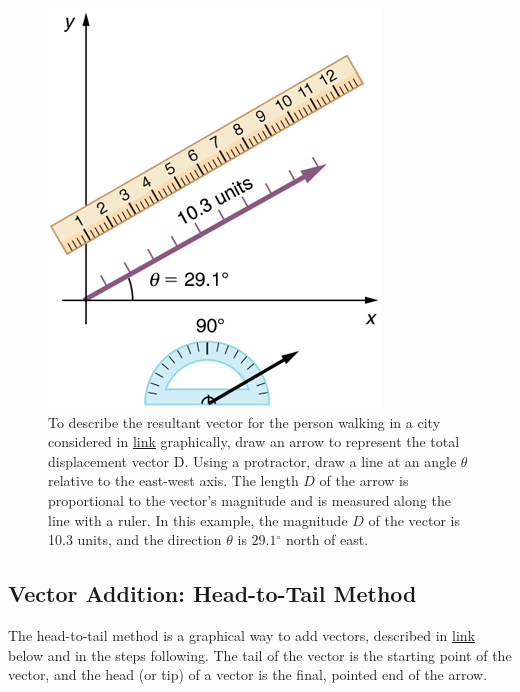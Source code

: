 \documentclass[
]{book}
\begin{document}
\begin{figure}
\hypertarget{import-auto-id1165298918248}{%
\centering
\includegraphics{images/Figure_03_02_02a.jpg}
\caption{To describe the resultant vector for the person walking in a city
considered in
\protect\hyperlink{import-auto-id1165298666909}{link}
graphically, draw an arrow to represent the total displacement vector
\(\text{D}{}\). Using a protractor, draw a line at an angle \(\theta{}\)
relative to the east-west axis. The length \(D{}\) of the arrow is
proportional to the vector's magnitude and is measured along the line
with a ruler. In this example, the magnitude \(D{}\) of the vector is 10.3
units, and the direction \(\theta{}\) is \(29.1{^\circ}\) north of
east.}\label{import-auto-id1165298918248}
}
\end{figure}

\hypertarget{fs-id1165298995028}{}
\hypertarget{vector-addition-head-to-tail-method}{%
\subsection{Vector Addition: Head-to-Tail Method}\label{vector-addition-head-to-tail-method}}

The \protect\hypertarget{import-auto-id1165298552505}{}{head-to-tail method}
is a graphical way to add vectors, described in
\protect\hyperlink{import-auto-id1165298643218}{link} below and
in the steps following. The \protect\hypertarget{import-auto-id1165298535408}{}{tail} of the vector is the starting point of the vector, and
the \protect\hypertarget{import-auto-id1165298982372}{}{head} (or tip) of a
vector is the final, pointed end of the arrow.
\end{document}
